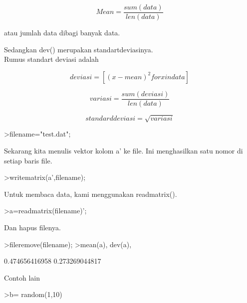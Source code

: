 \documentclass{article}
\begin{document}
\begin{eulernotebook}
\begin{eulercomment}
\begin{eulercomment}
\begin{eulercomment}
\end{eulercomment}
\begin{eulerformula}
\[
Mean = \frac{sum(data)}{len(data)}
\]
\end{eulerformula}
\begin{eulercomment}
atau jumlah data dibagi banyak data.

Sedangkan dev() merupakan standartdeviasinya.\\
Rumus standart deviasi adalah

\end{eulercomment}
\begin{eulerformula}
\[
deviasi= [(x-mean)^{2} for x in data]
\]
\end{eulerformula}
\begin{eulerformula}
\[
variasi= \frac{sum(deviasi)}{len(data)}
\]
\end{eulerformula}
\begin{eulerformula}
\[
standard deviasi=\sqrt{variasi}
\]
\end{eulerformula}
\begin{eulerprompt}
>filename="test.dat";
\end{eulerprompt}
\begin{eulercomment}
Sekarang kita menulis vektor kolom a' ke file. Ini menghasilkan satu
nomor di setiap baris file.
\end{eulercomment}
\begin{eulerprompt}
>writematrix(a',filename);
\end{eulerprompt}
\begin{eulercomment}
Untuk membaca data, kami menggunakan readmatrix().
\end{eulercomment}
\begin{eulerprompt}
>a=readmatrix(filename)';
\end{eulerprompt}
\begin{eulercomment}
Dan hapus filenya.
\end{eulercomment}
\begin{eulerprompt}
>fileremove(filename);
>mean(a), dev(a),
\end{eulerprompt}
\begin{euleroutput}
  0.474656416958
  0.273269044817
\end{euleroutput}
\begin{eulercomment}
Contoh lain
\end{eulercomment}
\begin{eulerprompt}
>b= random(1,10)
\end{eulerprompt}
\begin{euleroutput}

\end{euleroutput}
\end{eulercomment}
\end{eulercomment}
\end{eulernotebook}
\end{document}
